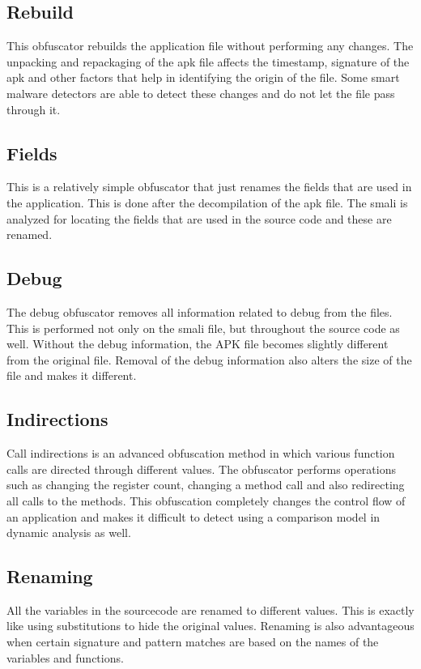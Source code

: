 \subsection{Rebuild}
This obfuscator rebuilds the application file without performing any changes. The unpacking and repackaging of the apk file affects the timestamp, signature of the apk and other factors that help in identifying the origin of the file. Some smart malware detectors are able to detect these changes and do not let the file pass through it.

\subsection{Fields}
This is a relatively simple obfuscator that just renames the fields that are used in the application. This is done after the decompilation of the apk file. The smali is analyzed for locating the fields that are used in the source code and these are renamed.

\subsection{Debug}
The debug obfuscator removes all information related to debug from the files. This is performed not only on the smali file, but throughout the source code as well. Without the debug information, the APK file becomes slightly different from the original file. Removal of the debug information also alters the size of the file and makes it different.

\subsection{Indirections}
Call indirections is an advanced obfuscation method in which various function calls are directed through different values. The obfuscator performs operations such as changing the register count, changing a method call and also redirecting all calls to the methods. This obfuscation completely changes the control flow of an application and makes it difficult to detect using a comparison model in dynamic analysis as well.

\subsection{Renaming}
All the variables in the sourcecode are renamed to different values. This is exactly like using substitutions to hide the original values. Renaming is also advantageous when certain signature and pattern matches are based on the names of the variables and functions.


